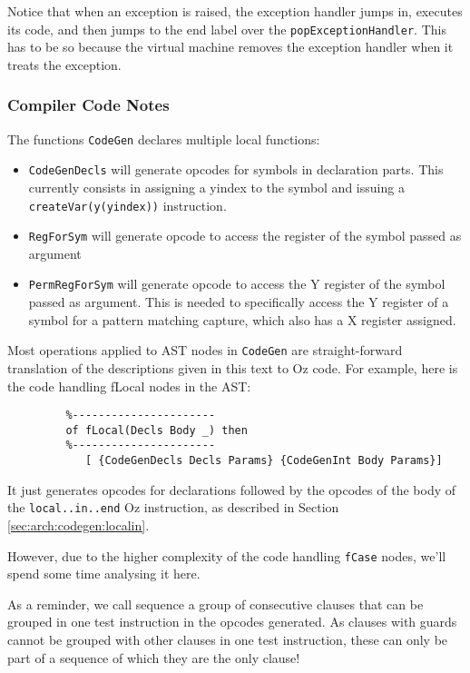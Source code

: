 \documentclass[a4paper]{memoir}
\begin{document}
Notice that when an exception is raised, the exception handler jumps in,
executes its code, and then jumps to the end label over the
\lstinline!popExceptionHandler!. This has to be so because the virtual
machine removes the exception handler when it treats the exception.


\subsubsection{Compiler Code Notes}
The functions \lstinline!CodeGen! declares multiple local functions:
\begin{itemize}
  \item \lstinline!CodeGenDecls! will generate opcodes for symbols in
    declaration parts. This currently consists in assigning a yindex to the
    symbol and issuing a \lstinline!createVar(y(yindex))! instruction.
  \item \lstinline!RegForSym! will generate opcode to access the register of the
    symbol passed as argument
  \item \lstinline!PermRegForSym! will generate opcode to access the Y register
    of the symbol passed as argument. This is needed to specifically access the
    Y register of a symbol for a pattern matching capture, which also has a X
    register assigned.
\end{itemize}

Most operations applied to AST nodes in \lstinline!CodeGen! are straight-forward translation of the
descriptions given in this text to Oz code. For example, here is the
code handling fLocal nodes in the AST:

\begin{lstlisting}
         %----------------------
         of fLocal(Decls Body _) then
         %----------------------
            [ {CodeGenDecls Decls Params} {CodeGenInt Body Params}]
\end{lstlisting}

It just generates opcodes for declarations followed by the opcodes of the body
of the \lstinline!local..in..end! Oz instruction, as described in Section
\ref{sec:arch:codegen:localin}.

However, due to the higher complexity of the code handling \lstinline!fCase! nodes, we'll
spend some time analysing it here.

As a reminder, we call sequence a group of consecutive clauses that can be
grouped in one test instruction in the opcodes generated. As clauses with guards
cannot be grouped with other clauses in one test instruction, these
can only be part of a sequence of which they are the only clause!
\end{document}
